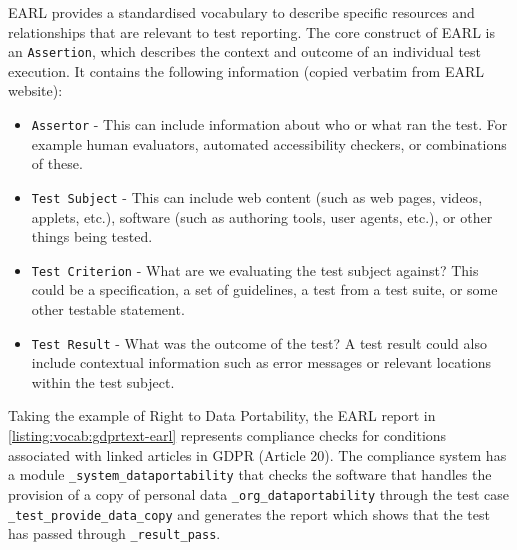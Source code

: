 EARL provides a standardised vocabulary to describe specific resources and relationships that are relevant to test reporting. The core construct of EARL is an \texttt{Assertion}, which describes the context and outcome of an individual test execution. It contains the following information (copied verbatim from EARL website):

\begin{itemize}
    \item \texttt{Assertor} - This can include information about who or what ran the test. For example human evaluators, automated accessibility checkers, or combinations of these.
    \item \texttt{Test Subject} - This can include web content (such as web pages, videos, applets, etc.), software (such as authoring tools, user agents, etc.), or other things being tested.
    \item \texttt{Test Criterion} - What are we evaluating the test subject against? This could be a specification, a set of guidelines, a test from a test suite, or some other testable statement.
    \item \texttt{Test Result} - What was the outcome of the test? A test result could also include contextual information such as error messages or relevant locations within the test subject.
\end{itemize}

Taking the example of Right to Data Portability, the EARL report in \autoref{listing:vocab:gdprtext-earl} represents compliance checks for conditions associated with linked articles in GDPR (Article 20). The compliance system has a module \texttt{\_system\_dataportability} that checks the software that handles the provision of a copy of personal data \texttt{\_org\_dataportability} through the test case \texttt{\_test\_provide\_data\_copy} and generates the report which shows that the test has passed through \texttt{\_result\_pass}.


